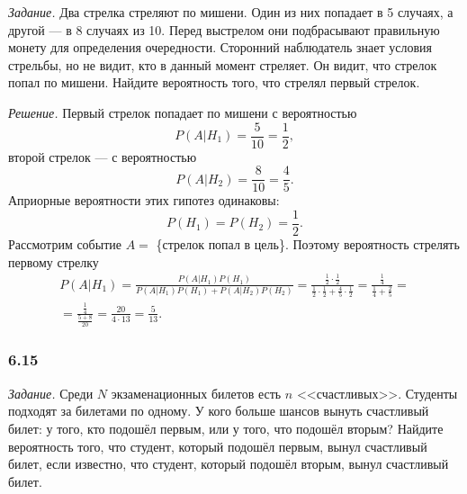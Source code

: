 \textit{Задание.} Два стрелка стреляют по мишени.
Один из них попадает в 5 случаях, а другой --- в 8 случаях из 10.
Перед выстрелом они подбрасывают правильную монету для определения очередности.
Сторонний наблюдатель знает условия стрельбы, но не видит, кто в данный момент стреляет.
Он видит, что стрелок попал по мишени.
Найдите вероятность того, что стрелял первый стрелок.

\textit{Решение.} Первый стрелок попадает по мишени с вероятностью
$$P \left( \left. A \right| H_1 \right) =
\frac{5}{10} =
\frac{1}{2},$$
второй стрелок --- с вероятностью
$$P \left( \left. A \right| H_2 \right) =
\frac{8}{10} =
\frac{4}{5}.$$
Априорные вероятности этих гипотез одинаковы:
$$P \left( H_1 \right) =
P \left( H_2 \right) =
\frac{1}{2}.$$
Рассмотрим событие $A =$ \{стрелок попал в цель\}.
Поэтому вероятность стрелять первому стрелку
\begin{equation*}
\begin{split}
P \left( \left. A \right| H_1 \right) =
\frac{P \left( \left. A \right| H_1 \right) P \left( H_1 \right) }{P \left( \left. A \right| H_1 \right) P \left( H_1 \right) +
P \left( \left. A \right| H_2 \right) P \left( H_2 \right) } =
\frac{ \frac{1}{2} \cdot \frac{1}{2} }{ \frac{1}{2} \cdot \frac{1}{2} + \frac{4}{5} \cdot \frac{1}{2} } =
\frac{ \frac{1}{4} }{ \frac{1}{4} + \frac{2}{5} } = \\
= \frac{ \frac{1}{4} }{ \frac{5+8}{20} } =
\frac{20}{4 \cdot 13} =
\frac{5}{13}.
\end{split}
\end{equation*}

\subsubsection*{6.15}

\textit{Задание.} Среди $N$ экзаменационных билетов есть $n$ <<счастливых>>.
Студенты подходят за билетами по одному.
У кого больше шансов вынуть счастливый билет: у того, кто подошёл первым, или у того, что подошёл вторым?
Найдите вероятность того, что студент, который подошёл первым, вынул счастливый билет, если известно, что студент, который подошёл вторым, вынул счастливый билет.

